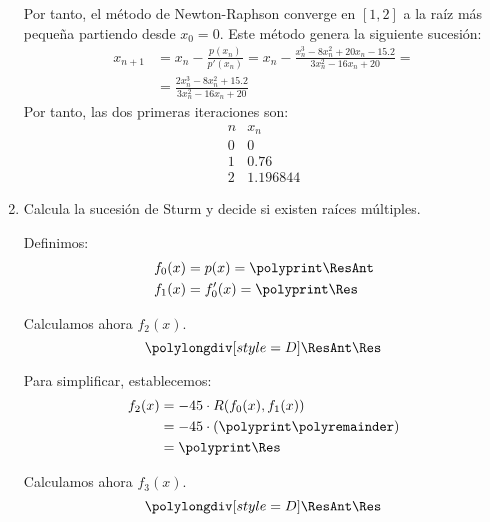 \begin{ejercicio}
\begin{enumerate}
        Por tanto, el método de Newton-Raphson converge en $\left[1,2\right]$ a la raíz más pequeña partiendo desde $x_0=0$. Este método genera la siguiente sucesión:
        \begin{align*}
            x_{n+1} &= x_n - \frac{p(x_n)}{p'(x_n)} = x_n - \frac{x_n^3 - 8x_n^2 + 20x_n - 15.2}{3x_n^2 - 16x_n + 20}=\\
            &= \frac{2x_n^3 - 8x_n^2 + 15.2}{3x_n^2 - 16x_n + 20}
        \end{align*}
        Por tanto, las dos primeras iteraciones son:
        \begin{equation*}
            \begin{array}{c|c}
                n & x_n\\ \hline
                0 & 0 \\
                1 & 0.76\\
                2 & 1.196844
            \end{array}
        \end{equation*}
        \item Calcula la sucesión de Sturm y decide si existen raíces múltiples.
        
        Definimos:
        \polymul{}
        \polymul{}
        \begin{align*}
            f_0(x) &= p(x) = \polyprint\ResAnt\\
            f_1(x) &= f_0'(x) = \polyprint\Res
        \end{align*}

        Calculamos ahora $f_2(x)$.
        \begin{equation*}
            \polylongdiv[style=D]\ResAnt\Res
        \end{equation*}
        \polydiv\div\ResAnt\Res
        \polymul\ResAnt{}
        \polymul\Res{}

        Para simplificar, establecemos:
        \begin{align*}
            f_2(x) &= -45\cdot R(f_0(x), f_1(x))\\
            &= -45\cdot \left(\polyprint\polyremainder\right)\\
            &= \polyprint\Res
        \end{align*}

        Calculamos ahora $f_3(x)$.
        \begin{equation*}
            \polylongdiv[style=D]\ResAnt\Res
        \end{equation*}
        \polydiv\div\ResAnt\Res
        \polymul\ResAnt{}
        \polymul\Res{}


\end{enumerate}
\end{ejercicio}
